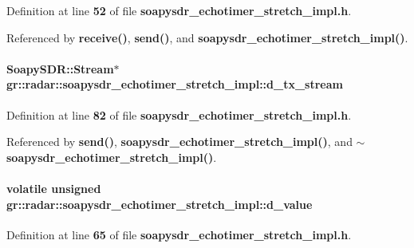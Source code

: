 Definition at line {\bf 52} of file {\bf soapysdr\+\_\+echotimer\+\_\+stretch\+\_\+impl.\+h}.



Referenced by {\bf receive()}, {\bf send()}, and {\bf soapysdr\+\_\+echotimer\+\_\+stretch\+\_\+impl()}.

\paragraph[{d\+\_\+tx\+\_\+stream}]{\setlength{\rightskip}{0pt plus 5cm}Soapy\+S\+D\+R\+::\+Stream$\ast$ gr\+::radar\+::soapysdr\+\_\+echotimer\+\_\+stretch\+\_\+impl\+::d\+\_\+tx\+\_\+stream\hspace{0.3cm}{\ttfamily [private]}}\label{classgr_1_1radar_1_1soapysdr__echotimer__stretch__impl_a95b7b9d8ee5a11e027098e9ef135e8fe}


Definition at line {\bf 82} of file {\bf soapysdr\+\_\+echotimer\+\_\+stretch\+\_\+impl.\+h}.



Referenced by {\bf send()}, {\bf soapysdr\+\_\+echotimer\+\_\+stretch\+\_\+impl()}, and {\bf $\sim$soapysdr\+\_\+echotimer\+\_\+stretch\+\_\+impl()}.

\paragraph[{d\+\_\+value}]{\setlength{\rightskip}{0pt plus 5cm}volatile unsigned gr\+::radar\+::soapysdr\+\_\+echotimer\+\_\+stretch\+\_\+impl\+::d\+\_\+value\hspace{0.3cm}{\ttfamily [private]}}\label{classgr_1_1radar_1_1soapysdr__echotimer__stretch__impl_aedaf519c5235d744289e4eb374901535}


Definition at line {\bf 65} of file {\bf soapysdr\+\_\+echotimer\+\_\+stretch\+\_\+impl.\+h}.



